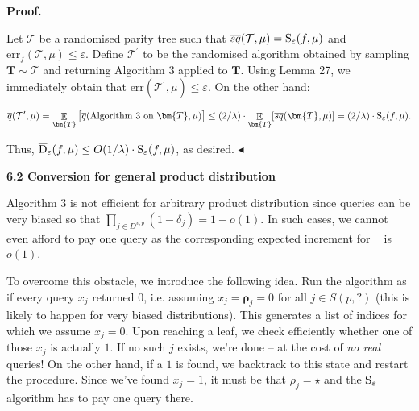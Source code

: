 \par\medskip\noindent\textbf{Proof.}\par




Let $\mathcal{T}$ be a randomised parity tree such that $\mathop{\overline{sq}}(\mathcal{T},\mu)={\textup{S}}_{\varepsilon}(f,\mu)$ and $\mathrm{err}_{f}(\mathcal{T},\mu)\leq\varepsilon$. Define $\mathcal{T}^{\prime}$ to be the randomised algorithm obtained by sampling $\bm{T}\sim\mathcal{T}$ and returning Algorithm 3 applied to $\bm{T}$. Using Lemma 27, we immediately obtain that $\mathrm{err}(\mathcal{T}^{\prime},\mu)\leq\varepsilon$. On the other hand:\par


\[\begin{gathered}
\overline{q}(\mathcal{T}^{\prime},\mu)=\mathop{\mathbb{E}}_{\bm{T}}\big{[}\overline{q}(\text{Algorithm 3 on $\bm{T}$},\mu)\big{]}\leq(2/\lambda)\cdot\mathop{\mathbb{E}}_{\bm{T}}[\mathop{\overline{sq}}(\bm{T},\mu)]=(2/\lambda)\cdot{\textup{S}}_{\varepsilon}(f,\mu).
\end{gathered}\]


Thus, $\overline{{\textup{D}}}_{\varepsilon}(f,\mu)\leq O(1/\lambda)\cdot{\textup{S}}_{\varepsilon}(f,\mu)$, as desired.
$\blacktriangleleft$\par







\par\medskip\noindent\textbf{
6.2 Conversion for general product distribution}\par




Algorithm 3 is not efficient for arbitrary product distribution since queries can be very biased so that $\prod_{j\in D^{v,p}}(1-\delta_{j})=1-o(1)$. In such cases, we cannot even afford to pay one query as the corresponding expected increment for $\mathop{\overline{sq}}$ is $o(1)$.\par




To overcome this obstacle, we introduce the following idea. Run the algorithm as if every query $x_{j}$ returned $0$, i.e. assuming $x_{j}=\bm{\rho}_{j}=0$ for all $j\in S(p,\mathord{?})$ (this is likely to happen for very biased distributions). This generates a list of indices for which we assume $x_{j}=0$. Upon reaching a leaf, we check efficiently whether one of those $x_{j}$ is actually $1$. If no such $j$ exists, we’re done – at the cost of \emph{no real} queries! On the other hand, if a $1$ is found, we backtrack to this state and restart the procedure. Since we’ve found $x_{j}=1$, it must be that $\rho_{j}=\star$ and the ${\textup{S}}_{\varepsilon}$ algorithm has to pay one query there.\par




